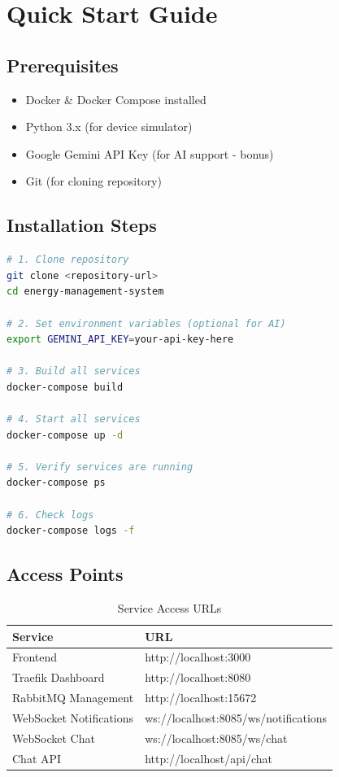 \documentclass[12pt,a4paper]{article}
\begin{document}
\section{Quick Start Guide}

\subsection{Prerequisites}
\begin{itemize}
    \item Docker \& Docker Compose installed
    \item Python 3.x (for device simulator)
    \item Google Gemini API Key (for AI support - bonus)
    \item Git (for cloning repository)
\end{itemize}

\subsection{Installation Steps}
\begin{lstlisting}[language=bash, caption=Installation Commands]
# 1. Clone repository
git clone <repository-url>
cd energy-management-system

# 2. Set environment variables (optional for AI)
export GEMINI_API_KEY=your-api-key-here

# 3. Build all services
docker-compose build

# 4. Start all services
docker-compose up -d

# 5. Verify services are running
docker-compose ps

# 6. Check logs
docker-compose logs -f
\end{lstlisting}

\subsection{Access Points}
\begin{table}[H]
\centering
\begin{tabular}{|l|l|}
\hline
\textbf{Service} & \textbf{URL} \\
\hline
Frontend & http://localhost:3000 \\
Traefik Dashboard & http://localhost:8080 \\
RabbitMQ Management & http://localhost:15672 \\
WebSocket Notifications & ws://localhost:8085/ws/notifications \\
WebSocket Chat & ws://localhost:8085/ws/chat \\
Chat API & http://localhost/api/chat \\
\hline
\end{tabular}
\caption{Service Access URLs}
\end{table}
\end{document}
